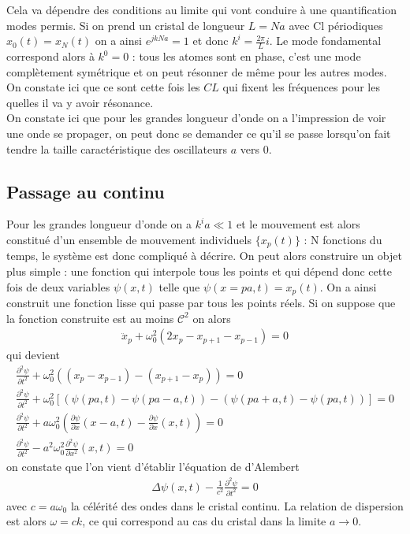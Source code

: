 \documentclass[12pt,prb,aps,epsf]{article}
\begin{document}
 Cela va dépendre des conditions au limite qui vont conduire à une quantification modes permis. Si on prend un cristal de longueur $L=Na $ avec Cl périodiques $x_0(t) = x_N(t)$ on a ainsi $e^{jkNa} = 1$ et donc $k^i = \frac{2\pi}{L} i$. Le mode fondamental correspond alors à $k^0=0$ : tous les atomes sont en phase, c'est une mode complètement symétrique et on peut résonner de même pour les autres modes.\\
 
  On constate ici que ce sont cette fois les $CL$ qui fixent les fréquences pour les quelles il va y avoir résonance.\\
  
 On constate ici que pour les grandes longueur d'onde on a  l'impression de voir une onde se propager, on peut donc se demander ce qu'il se passe lorsqu'on fait tendre la taille caractéristique des oscillateurs $a$ vers 0.
\subsection{Passage au continu}
Pour les grandes longueur d'onde on a $k^ia\ll1$ et le mouvement est alors constitué d'un ensemble de mouvement individuels $\{x_p(t)\}$ : N fonctions du temps, le système est donc compliqué à décrire. On peut alors construire un objet plus simple : une fonction qui interpole tous les points et qui dépend donc cette fois de deux variables $\psi(x,t)$ telle que $\psi(x=pa,t) = x_p(t)$. On a ainsi construit une fonction lisse qui passe par tous les points réels. Si on suppose que la fonction construite est au moins $\mathcal{C}^2$ on alors 
\begin{eqnarray}
\ddot{x}_p + \omega_0^2 (2x_p - x_{p+1} - x_{p-1}) = 0
\end{eqnarray}
qui devient 
\begin{eqnarray}
\frac{\partial^2 \psi}{\partial t^2} + \omega_0^2 ((x_p-x_{p-1}) -(x_{p+1}-x_p)) = 0\\
 \frac{\partial^2 \psi}{\partial t^2} + \omega_0^2 [(\psi(pa,t)-\psi(pa-a,t)) - (\psi(pa+a,t)-\psi(pa,t))] =0\\
 \frac{\partial^2 \psi}{\partial t^2} + a\omega_0^2 \left(\frac{\partial \psi}{\partial x} (x-a,t) -\frac{\partial \psi}{\partial x} (x,t) \right) = 0\\
 \frac{\partial^2 \psi}{\partial t^2} - a^2\omega_0^2\frac{\partial^2 \psi}{\partial x^2} (x,t) = 0
\end{eqnarray}
on constate que l'on vient d'établir l'équation de d'Alembert 
\begin{eqnarray}
\Delta \psi(x,t) - \frac{1}{c^2}\frac{\partial^2 \psi}{\partial t^2} = 0
\end{eqnarray}
avec $c=a\omega_0$ la célérité des ondes dans le cristal continu. La relation de dispersion est alors $\omega = ck$, ce qui correspond au cas du cristal dans la limite $a\rightarrow0$.\\
\end{document}
